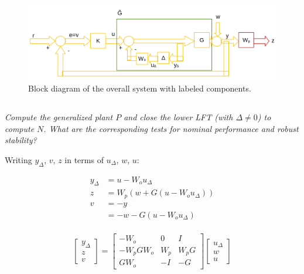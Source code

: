 \documentclass{article}
\begin{document}
\begin{figure}[H]
    \centering
    \includegraphics[width=\textwidth]{1blockDiagram.png}
    \caption{Block diagram of the overall system with labeled components.}
    \label{fig:1blockDiagram}
\end{figure}

\subsection{} 
\textit{Compute the generalized plant $P$ and close the lower LFT (with $\Delta \neq 0$) to compute $N$. What are the corresponding tests for nominal performance and robust stability?}

Writing $y_{\Delta}$, $v$, $z$ in terms of $u_{\Delta}$, $w$, $u$:

\begin{align*}
    y_{\Delta} &= u - W_o u_{\Delta} \\
    z &= W_p(w + G(u - W_o u_{\Delta})) \\
    v &= -y \\
      &= -w -G(u-W_o u_{\Delta}) \\
\end{align*}

\[
\begin{bmatrix}
    y_{\Delta} \\
    z \\
    v
\end{bmatrix}
=
\begin{bmatrix}
    -W_o & 0 & I \\
    -W_p G W_o & W_p & W_p G \\
    G W_o & -I & -G
\end{bmatrix}
\begin{bmatrix}
    u_{\Delta} \\
    w \\
    u
\end{bmatrix}
\]
\end{document}
